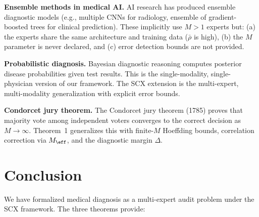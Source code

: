 \documentclass[11pt,a4paper]{article}
\theoremstyle{definition}
\newcommand{\SCX}{\textsc{SCX}}
\begin{document}
\textbf{Ensemble methods in medical AI.} AI research has produced ensemble
diagnostic models (e.g., multiple CNNs for radiology, ensemble of gradient-boosted
trees for clinical prediction). These implicitly use $M > 1$ experts but:
(a) the experts share the same architecture and training data ($\bar{\rho}$
is high), (b) the $M$ parameter is never declared, and (c) error detection
bounds are not provided.

\textbf{Probabilistic diagnosis.} Bayesian diagnostic reasoning \cite{ledley1959reasoning}
computes posterior disease probabilities given test results. This is the
single-modality, single-physician version of our framework. The \SCX{} extension
is the multi-expert, multi-modality generalization with explicit error bounds.

\textbf{Condorcet jury theorem.} The Condorcet jury theorem (1785) proves
that majority vote among independent voters converges to the correct decision
as $M \to \infty$. Theorem~1 generalizes this with finite-$M$ Hoeffding
bounds, correlation correction via $M_{\eff}$, and the diagnostic margin $\Delta$.

\section{Conclusion}
\label{sec:conclusion}

We have formalized medical diagnosis as a multi-expert audit problem under
the \SCX{} framework. The three theorems provide:
\end{document}
